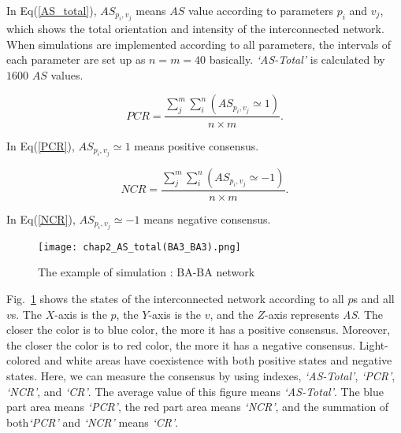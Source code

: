 In Eq(\ref{AS_total}), ${A{S_{{p _i},{v _j}}}}$ means $AS$ value according to parameters $p_i$ and $v_j$, which shows the total orientation and intensity of the interconnected network. When simulations are implemented according to all parameters, the intervals of each parameter are set up as $n = m = 40$ basically. \textit{`AS-Total'} is calculated by $1600$ $AS$ values.   

\begin{equation}
PCR = \frac{{\sum\limits_j^m {\sum\limits_i^n {(A{S_{{p _i},{v _j}}} \simeq  1)} } }}{{n \times m}}.
\label{PCR}
\end{equation}

In Eq(\ref{PCR}),  ${A{S_{{p _i},{v _j}}} \simeq  1}$ means positive consensus.

\begin{equation}
NCR = \frac{{\sum\limits_j^m {\sum\limits_i^n {(A{S_{{p _i},{v _j}}} \simeq   - 1)} } }}{{n \times m}}.
\label{NCR}
\end{equation}

In Eq(\ref{NCR}), ${A{S_{{p _i},{v _j}}} \simeq  -1}$ means negative consensus.


\begin{figure}[!htb]
	\centering
	\texttt{[image: chap2\_AS\_total(BA3\_BA3).png]}
	\caption{The example of simulation : BA-BA network}
	\label{chap2_AS_total(BA3_BA3)}
\end{figure}

Fig.~\ref{chap2_AS_total(BA3_BA3)} shows the states of the interconnected network according to all $p$s and all $v$s. The $X$-axis is the $p$, the $Y$-axis is the $v$, and the $Z$-axis represents \textit{AS}. The closer the color is to blue color, the more it has a positive consensus. Moreover, the closer the color is to red color, the more it has a negative consensus. Light-colored and white areas have coexistence with both positive states and negative states. Here, we can measure the consensus by using indexes, \textit{`AS-Total'}, \textit{`PCR'}, \textit{`NCR'}, and \textit{`CR'}. The average value of this figure means \textit{`AS-Total'}. The blue part area means \textit{`PCR'}, the red part area means \textit{`NCR'}, and the summation of both\textit{`PCR'} and \textit{`NCR'} means \textit{`CR'}. \\



    
